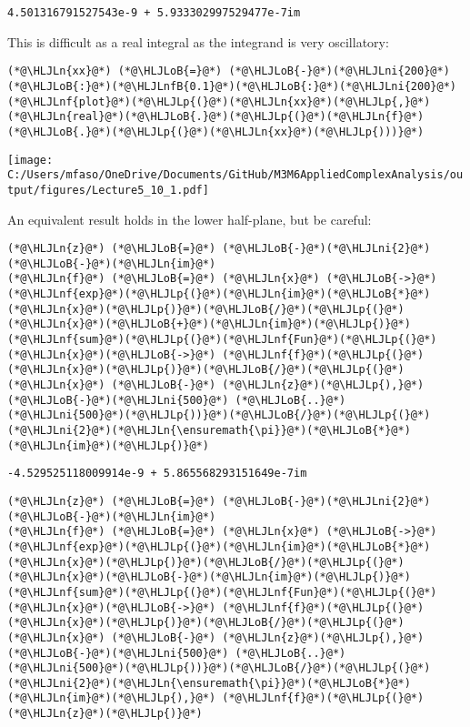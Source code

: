 \documentclass[12pt,a4paper]{article}
\newcommand{\HLJLn}[1]{#1}
\newcommand{\HLJLnf}[1]{\textcolor[RGB]{66,102,213}{#1}}
\newcommand{\HLJLnfB}[1]{\textcolor[RGB]{59,151,46}{#1}}
\newcommand{\HLJLni}[1]{\textcolor[RGB]{59,151,46}{#1}}
\newcommand{\HLJLoB}[1]{\textcolor[RGB]{102,102,102}{\textbf{#1}}}
\newcommand{\HLJLp}[1]{#1}
\begin{document}
\begin{lstlisting}
4.501316791527543e-9 + 5.933302997529477e-7im
\end{lstlisting}


This is difficult as a real integral as the integrand is very oscillatory:


\begin{lstlisting}
(*@\HLJLn{xx}@*) (*@\HLJLoB{=}@*) (*@\HLJLoB{-}@*)(*@\HLJLni{200}@*)(*@\HLJLoB{:}@*)(*@\HLJLnfB{0.1}@*)(*@\HLJLoB{:}@*)(*@\HLJLni{200}@*)
(*@\HLJLnf{plot}@*)(*@\HLJLp{(}@*)(*@\HLJLn{xx}@*)(*@\HLJLp{,}@*)(*@\HLJLn{real}@*)(*@\HLJLoB{.}@*)(*@\HLJLp{(}@*)(*@\HLJLn{f}@*)(*@\HLJLoB{.}@*)(*@\HLJLp{(}@*)(*@\HLJLn{xx}@*)(*@\HLJLp{)))}@*)
\end{lstlisting}

\texttt{[image: C:/Users/mfaso/OneDrive/Documents/GitHub/M3M6AppliedComplexAnalysis/output/figures/Lecture5\_10\_1.pdf]}

An equivalent result holds in the lower half-plane, but be careful:


\begin{lstlisting}
(*@\HLJLn{z}@*) (*@\HLJLoB{=}@*) (*@\HLJLoB{-}@*)(*@\HLJLni{2}@*)(*@\HLJLoB{-}@*)(*@\HLJLn{im}@*)
(*@\HLJLn{f}@*) (*@\HLJLoB{=}@*) (*@\HLJLn{x}@*) (*@\HLJLoB{->}@*) (*@\HLJLnf{exp}@*)(*@\HLJLp{(}@*)(*@\HLJLn{im}@*)(*@\HLJLoB{*}@*)(*@\HLJLn{x}@*)(*@\HLJLp{)}@*)(*@\HLJLoB{/}@*)(*@\HLJLp{(}@*)(*@\HLJLn{x}@*)(*@\HLJLoB{+}@*)(*@\HLJLn{im}@*)(*@\HLJLp{)}@*)
(*@\HLJLnf{sum}@*)(*@\HLJLp{(}@*)(*@\HLJLnf{Fun}@*)(*@\HLJLp{(}@*)(*@\HLJLn{x}@*)(*@\HLJLoB{->}@*) (*@\HLJLnf{f}@*)(*@\HLJLp{(}@*)(*@\HLJLn{x}@*)(*@\HLJLp{)}@*)(*@\HLJLoB{/}@*)(*@\HLJLp{(}@*)(*@\HLJLn{x}@*) (*@\HLJLoB{-}@*) (*@\HLJLn{z}@*)(*@\HLJLp{),}@*) (*@\HLJLoB{-}@*)(*@\HLJLni{500}@*) (*@\HLJLoB{..}@*) (*@\HLJLni{500}@*)(*@\HLJLp{))}@*)(*@\HLJLoB{/}@*)(*@\HLJLp{(}@*)(*@\HLJLni{2}@*)(*@\HLJLn{\ensuremath{\pi}}@*)(*@\HLJLoB{*}@*)(*@\HLJLn{im}@*)(*@\HLJLp{)}@*)
\end{lstlisting}

\begin{lstlisting}
-4.529525118009914e-9 + 5.865568293151649e-7im
\end{lstlisting}


\begin{lstlisting}
(*@\HLJLn{z}@*) (*@\HLJLoB{=}@*) (*@\HLJLoB{-}@*)(*@\HLJLni{2}@*)(*@\HLJLoB{-}@*)(*@\HLJLn{im}@*)
(*@\HLJLn{f}@*) (*@\HLJLoB{=}@*) (*@\HLJLn{x}@*) (*@\HLJLoB{->}@*) (*@\HLJLnf{exp}@*)(*@\HLJLp{(}@*)(*@\HLJLn{im}@*)(*@\HLJLoB{*}@*)(*@\HLJLn{x}@*)(*@\HLJLp{)}@*)(*@\HLJLoB{/}@*)(*@\HLJLp{(}@*)(*@\HLJLn{x}@*)(*@\HLJLoB{-}@*)(*@\HLJLn{im}@*)(*@\HLJLp{)}@*)
(*@\HLJLnf{sum}@*)(*@\HLJLp{(}@*)(*@\HLJLnf{Fun}@*)(*@\HLJLp{(}@*)(*@\HLJLn{x}@*)(*@\HLJLoB{->}@*) (*@\HLJLnf{f}@*)(*@\HLJLp{(}@*)(*@\HLJLn{x}@*)(*@\HLJLp{)}@*)(*@\HLJLoB{/}@*)(*@\HLJLp{(}@*)(*@\HLJLn{x}@*) (*@\HLJLoB{-}@*) (*@\HLJLn{z}@*)(*@\HLJLp{),}@*) (*@\HLJLoB{-}@*)(*@\HLJLni{500}@*) (*@\HLJLoB{..}@*) (*@\HLJLni{500}@*)(*@\HLJLp{))}@*)(*@\HLJLoB{/}@*)(*@\HLJLp{(}@*)(*@\HLJLni{2}@*)(*@\HLJLn{\ensuremath{\pi}}@*)(*@\HLJLoB{*}@*)(*@\HLJLn{im}@*)(*@\HLJLp{),}@*) (*@\HLJLnf{f}@*)(*@\HLJLp{(}@*)(*@\HLJLn{z}@*)(*@\HLJLp{)}@*)
\end{lstlisting}
\end{document}
